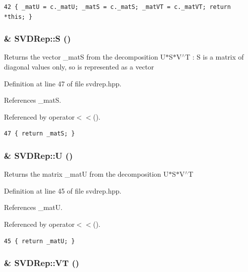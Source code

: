\footnotesize\begin{verbatim}42 { _matU = c._matU; _matS = c._matS; _matVT = c._matVT; return *this; }
\end{verbatim}\normalsize 


\subsubsection{\& SVDRep::S ()\hspace{0.3cm}{\tt  [inline]}}\label{classSVDRep_5380188e11c151eb8ac08ad5a53a4283_5380188e11c151eb8ac08ad5a53a4283}


Returns the vector \_\-mat\-S from the decomposition U$\ast$S$\ast$V$^\wedge$T : S is a matrix of diagonal values only, so is represented as a vector 

Definition at line 47 of file svdrep.hpp.

References \_\-mat\-S.

Referenced by operator$<$$<$().

\footnotesize\begin{verbatim}47 { return _matS; }
\end{verbatim}\normalsize 


\subsubsection{\& SVDRep::U ()\hspace{0.3cm}{\tt  [inline]}}\label{classSVDRep_28fb8f1bf8867a849fc613e360174385_28fb8f1bf8867a849fc613e360174385}


Returns the matrix \_\-mat\-U from the decomposition U$\ast$S$\ast$V$^\wedge$T 

Definition at line 45 of file svdrep.hpp.

References \_\-mat\-U.

Referenced by operator$<$$<$().

\footnotesize\begin{verbatim}45 { return _matU; }
\end{verbatim}\normalsize 


\subsubsection{\& SVDRep::VT ()\hspace{0.3cm}{\tt  [inline]}}\label{classSVDRep_e516b8f01548ae906a69979aa9b3608e_e516b8f01548ae906a69979aa9b3608e}


